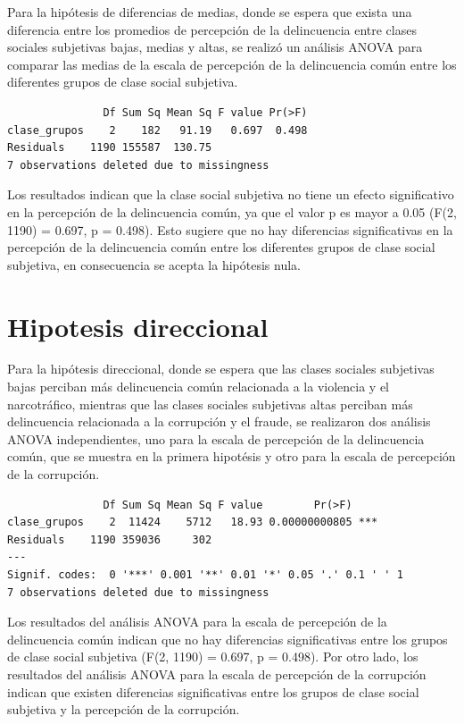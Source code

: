 \documentclass[
  spanish,
  a4paper,
  oneside]{scrbook}
\begin{document}
Para la hipótesis de diferencias de medias, donde se espera que exista
una diferencia entre los promedios de percepción de la delincuencia
entre clases sociales subjetivas bajas, medias y altas, se realizó un
análisis ANOVA para comparar las medias de la escala de percepción de la
delincuencia común entre los diferentes grupos de clase social
subjetiva.

\begin{verbatim}
               Df Sum Sq Mean Sq F value Pr(>F)
clase_grupos    2    182   91.19   0.697  0.498
Residuals    1190 155587  130.75               
7 observations deleted due to missingness
\end{verbatim}

Los resultados indican que la clase social subjetiva no tiene un efecto
significativo en la percepción de la delincuencia común, ya que el valor
p es mayor a 0.05 (F(2, 1190) = 0.697, p = 0.498). Esto sugiere que no
hay diferencias significativas en la percepción de la delincuencia común
entre los diferentes grupos de clase social subjetiva, en consecuencia
se acepta la hipótesis nula.

\section{Hipotesis direccional}\label{hipotesis-direccional-1}

Para la hipótesis direccional, donde se espera que las clases sociales
subjetivas bajas perciban más delincuencia común relacionada a la
violencia y el narcotráfico, mientras que las clases sociales subjetivas
altas perciban más delincuencia relacionada a la corrupción y el fraude,
se realizaron dos análisis ANOVA independientes, uno para la escala de
percepción de la delincuencia común, que se muestra en la primera
hipotésis y otro para la escala de percepción de la corrupción.

\begin{verbatim}
               Df Sum Sq Mean Sq F value        Pr(>F)    
clase_grupos    2  11424    5712   18.93 0.00000000805 ***
Residuals    1190 359036     302                          
---
Signif. codes:  0 '***' 0.001 '**' 0.01 '*' 0.05 '.' 0.1 ' ' 1
7 observations deleted due to missingness
\end{verbatim}

Los resultados del análisis ANOVA para la escala de percepción de la
delincuencia común indican que no hay diferencias significativas entre
los grupos de clase social subjetiva (F(2, 1190) = 0.697, p = 0.498).
Por otro lado, los resultados del análisis ANOVA para la escala de
percepción de la corrupción indican que existen diferencias
significativas entre los grupos de clase social subjetiva y la
percepción de la corrupción.
\end{document}
